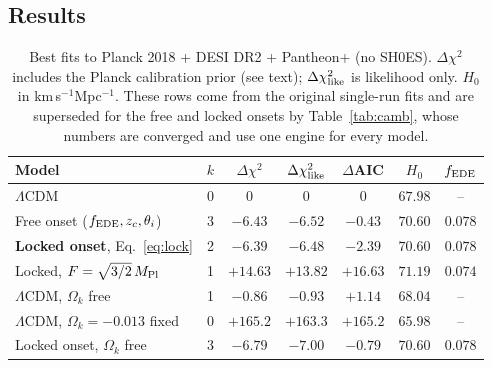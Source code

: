 \documentclass[11pt]{article}
\newcommand{\Mp}{M_{\rm Pl}}
\begin{document}
\subsection{Results}
\begin{table}[h]
\centering
\small
\begin{tabular}{lcccccc}
\toprule
Model & $k$ & $\Delta\chi^2$ & $\Delta\chi^2_{\rm like}$ & $\Delta$AIC & $H_0$ & $f_{\rm EDE}$\\
\midrule
$\Lambda$CDM & 0 & $0$ & $0$ & $0$ & $67.98$ & --\\
Free onset ($f_{\rm EDE},z_c,\theta_i$) & 3 & $-6.43$ & $-6.52$ & $-0.43$ & $70.60$ & $0.078$\\
\textbf{Locked onset}, Eq.~\eqref{eq:lock} & 2 & $\mathbf{-6.39}$ & $-6.48$ & $\mathbf{-2.39}$ & $70.60$ & $0.078$\\
Locked, $F=\sqrt{3/2}\,\Mp$ & 1 & $+14.63$ & $+13.82$ & $+16.63$ & $71.19$ & $0.074$\\
\midrule
$\Lambda$CDM, $\Omega_k$ free & 1 & $-0.86$ & $-0.93$ & $+1.14$ & $68.04$ & --\\
$\Lambda$CDM, $\Omega_k=-0.013$ fixed & 0 & $+165.2$ & $+163.3$ & $+165.2$ & $65.98$ & --\\
Locked onset, $\Omega_k$ free & 3 & $-6.79$ & $-7.00$ & $-0.79$ & $70.60$ & $0.078$\\
\bottomrule
\end{tabular}
\caption{Best fits to Planck 2018 + DESI DR2 + Pantheon+ (no SH0ES). $\Delta\chi^2$ includes
the Planck calibration prior (see text); $\Delta\chi^2_{\rm like}$ is likelihood only.
$H_0$ in km\,s$^{-1}$Mpc$^{-1}$. These rows come from the original single-run
fits and are superseded for the free and locked onsets by Table~\ref{tab:camb}, whose
numbers are converged and use one engine for every model.}
\label{tab:fits}
\end{table}
\end{document}
